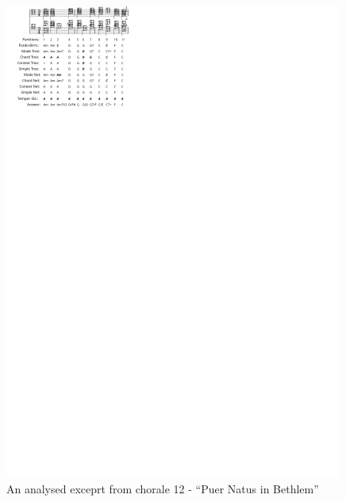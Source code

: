 \documentclass{article}
\begin{document}
\begin{figure}
  \centering
  \includegraphics[scale=4]{coral-012}
  \caption{An analysed exceprt from chorale 12 - ``Puer Natus in Bethlem''}
  \label{fig:coral-12}
\end{figure}
\end{document}
